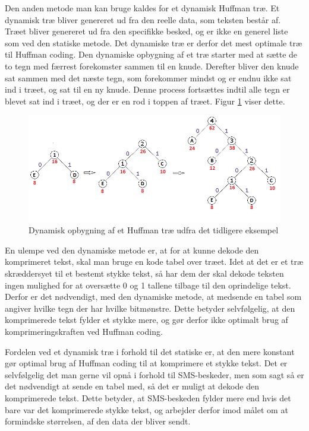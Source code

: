 Den anden metode man kan bruge kaldes for et dynamisk Huffman træ. Et dynamisk træ bliver genereret ud fra den reelle data, som teksten består af. Træet bliver genereret ud fra den specifikke besked, og er ikke en generel liste som ved den statiske metode. Det dynamiske træ er derfor det mest optimale træ til Huffman coding. Den dynamiske opbygning af et træ starter med at sætte de to tegn med færrest forekomster sammen til en knude. Derefter bliver den knude sat sammen med det næste tegn, som forekommer mindst og er endnu ikke sat ind i træet, og sat til en ny knude. Denne process fortsættes indtil alle tegn er blevet sat ind i træet, og der er en rod i toppen af træet. Figur \ref{fig:dynamic_tree} viser dette.

\begin{figure}[H]
\centering
\includegraphics[width=\linewidth]{Billeder/dynamisk.png}
\caption{Dynamisk opbygning af et Huffman træ udfra det tidligere eksempel \cite{Hufftree_1}}
\label{fig:dynamic_tree}
\end{figure}

En ulempe ved den dynamiske metode er, at for at kunne dekode den komprimeret tekst, skal man bruge en kode tabel over træet. Idet at det er et træ skræddersyet til et bestemt stykke tekst, så har dem der skal dekode teksten ingen mulighed for at oversætte 0 og 1 tallene tilbage til den oprindelige tekst. Derfor er det nødvendigt, med den dynamiske metode, at medsende en tabel som angiver hvilke tegn der har hvilke bitmønstre. Dette betyder selvfølgelig, at den komprimerede tekst fylder et stykke mere, og gør derfor ikke optimalt brug af komprimeringskraften ved Huffman coding. \cite{Hufftree_4}

Fordelen ved et dynamisk træ i forhold til det statiske er, at den mere konstant gør optimal brug af Huffman coding til at komprimere et stykke tekst. Det er selvfølgelig det man gerne vil opnå i forhold til SMS-beskeder, men som sagt så er det nødvendigt at sende en tabel med, så det er muligt at dekode den komprimerede tekst. Dette betyder, at SMS-beskeden fylder mere end hvis det bare var det komprimerede stykke tekst, og arbejder derfor imod målet om at formindske størrelsen, af den data der bliver sendt.
